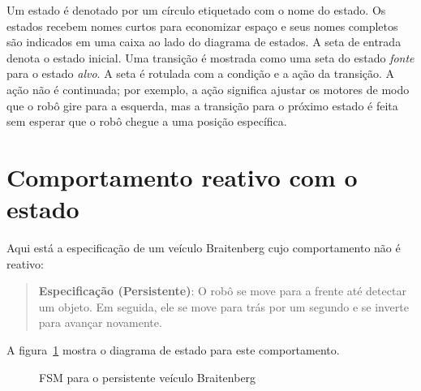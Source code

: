 Um estado é denotado por um círculo etiquetado com o nome do estado. Os estados recebem nomes curtos para economizar espaço e seus nomes completos são indicados em uma caixa ao lado do diagrama de estados. A seta de entrada denota o estado inicial. Uma transição é mostrada como uma seta do estado \emph{fonte} para o estado \emph{alvo}. A seta é rotulada com a condição e a ação da transição. A ação não é continuada; por exemplo, a ação  significa ajustar os motores de modo que o robô gire para a esquerda, mas a transição para o próximo estado é feita sem esperar que o robô chegue a uma posição específica.

\section{Comportamento reativo com o estado}\label{s.reactive-state}

Aqui está a especificação de um veículo Braitenberg cujo comportamento não é reativo:

\begin{quote}
\normalsize\noindent\textbf{Especificação (Persistente)}: O robô se move para a frente até detectar um objeto. Em seguida, ele se move para trás por um segundo e se inverte para avançar novamente.
\end{quote}
A figura~\ref{fig.persistent} mostra o diagrama de estado para este comportamento.

\begin{figure}
\begin{center}
\caption{FSM para o persistente veículo Braitenberg}\label{fig.persistent}
\end{center}
\end{figure}

